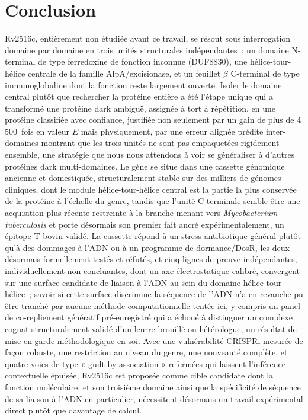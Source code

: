 \documentclass[11pt,a4paper]{article}
\newcommand{\mtb}{\textit{Mycobacterium tuberculosis}}
\begin{document}
\section{Conclusion}

Rv2516c, entièrement non étudiée avant ce travail, se résout sous interrogation domaine par domaine
en trois unités structurales indépendantes~: un domaine N-terminal de type ferredoxine de fonction
inconnue (DUF8830), une hélice-tour-hélice centrale de la famille AlpA/excisionase, et un feuillet
$\beta$ C-terminal de type immunoglobuline dont la fonction reste largement ouverte. Isoler le
domaine central plutôt que rechercher la protéine entière a été l'étape unique qui a transformé une
protéine dark ambiguë, assignée à tort à répétition, en une protéine classifiée avec confiance,
justifiée non seulement par un gain de plus de 4\,500~fois en valeur $E$ mais physiquement, par une
erreur alignée prédite inter-domaines montrant que les trois unités ne sont pas empaquetées
rigidement ensemble, une
stratégie que nous nous attendons à voir se généraliser à d'autres protéines dark multi-domaines.
Le gène se situe dans une cassette génomique ancienne et domestiquée, structuralement stable sur
des milliers de génomes cliniques, dont le module hélice-tour-hélice central est la partie la plus
conservée de la protéine à l'échelle du genre, tandis que l'unité C-terminale semble être une
acquisition plus récente restreinte à la branche menant vers \mtb{} et porte désormais son premier
fait ancré expérimentalement, un épitope T bovin validé. La cassette répond à un stress
antibiotique général plutôt qu'à des dommages à l'ADN ou à un programme de dormance/DosR, les deux
désormais formellement testés et réfutés, et cinq lignes de preuve indépendantes,
individuellement non concluantes, dont un axe électrostatique calibré, convergent sur une
surface candidate de liaison à l'ADN au sein
du domaine hélice-tour-hélice~; savoir si cette surface discrimine la séquence de l'ADN n'a en
revanche pu être tranché par aucune méthode computationnelle tentée ici, y compris un panel de
co-repliement génératif pré-enregistré qui a échoué à distinguer un complexe cognat structuralement
validé d'un leurre brouillé ou hétérologue, un résultat de mise en garde méthodologique en soi.
Avec une
vulnérabilité CRISPRi mesurée de façon robuste, une restriction au niveau du genre, une nouveauté
complète, et quatre voies de type « guilt-by-association » refermées qui laissent l'inférence
contextuelle épuisée, Rv2516c est proposée comme cible candidate dont la fonction moléculaire, et
son troisième
domaine ainsi que la spécificité de séquence de sa liaison à l'ADN en particulier, nécessitent
désormais un travail expérimental direct plutôt que davantage de calcul.
\end{document}
